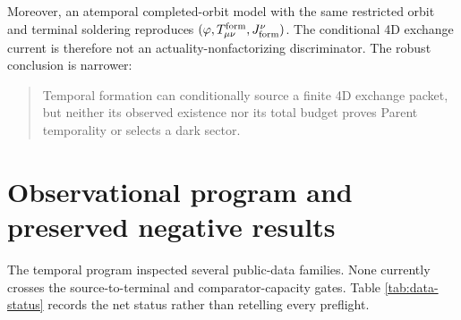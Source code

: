 \documentclass[11pt]{article}
\begin{document}
Moreover, an atemporal completed-orbit model with the same restricted orbit
and terminal soldering reproduces
\((\varphi,T_{\mu\nu}^{\rm form},J_{\rm form}^\nu)\).  The conditional 4D
exchange current is therefore not an actuality-nonfactorizing discriminator.
The robust conclusion is narrower:
\begin{quote}
Temporal formation can conditionally source a finite 4D exchange packet, but
neither its observed existence nor its total budget proves Parent temporality
or selects a dark sector.
\end{quote}

\section{Observational program and preserved negative results}

The temporal program inspected several public-data families.  None currently
crosses the source-to-terminal and comparator-capacity gates.  Table
\ref{tab:data-status} records the net status rather than retelling every
preflight.
\end{document}
